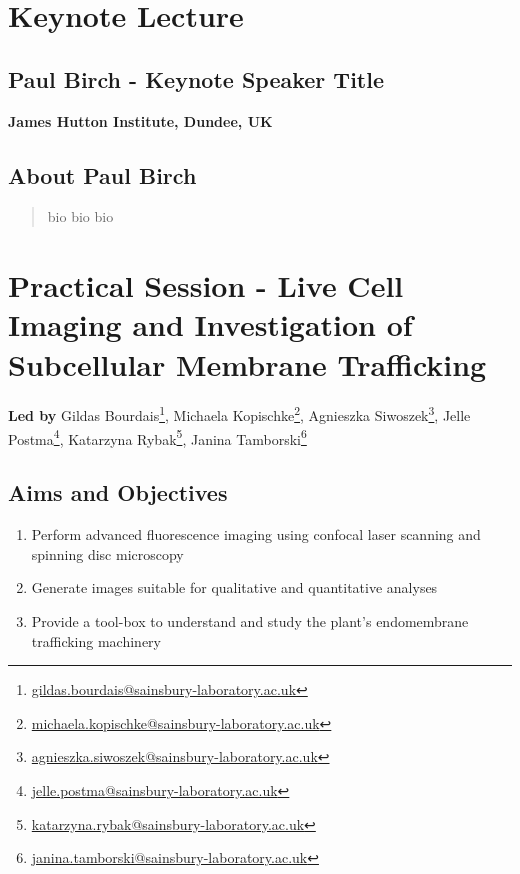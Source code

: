 \documentclass[12pt,]{book}
\providecommand{\tightlist}{%
  \setlength{\itemsep}{0pt}\setlength{\parskip}{0pt}}
\let\rmarkdownfootnote\footnote%
\def\footnote{\protect\rmarkdownfootnote}
\renewcommand{\href}[2]{#2\footnote{\url{#1}}}
\begin{document}
\section*{Keynote Lecture}\label{keynote-lecture-4}

\subsection*{Paul Birch - Keynote Speaker
Title}\label{paul-birch---keynote-speaker-title}

\textbf{James Hutton Institute, Dundee, UK}

\subsection*{About Paul Birch}\label{about-paul-birch}

\begin{quote}
bio bio bio
\end{quote}

\section*{Practical Session - Live Cell Imaging and Investigation of
Subcellular Membrane
Trafficking}\label{practical-session---live-cell-imaging-and-investigation-of-subcellular-membrane-trafficking}

\textbf{Led by} \href{gildas.bourdais@sainsbury-laboratory.ac.uk}{Gildas
Bourdais}, \href{michaela.kopischke@sainsbury-laboratory.ac.uk}{Michaela
Kopischke},
\href{agnieszka.siwoszek@sainsbury-laboratory.ac.uk}{Agnieszka
Siwoszek}, \href{jelle.postma@sainsbury-laboratory.ac.uk}{Jelle Postma},
\href{katarzyna.rybak@sainsbury-laboratory.ac.uk}{Katarzyna Rybak},
\href{janina.tamborski@sainsbury-laboratory.ac.uk}{Janina Tamborski}

\subsection*{Aims and Objectives}\label{aims-and-objectives-4}

\begin{enumerate}
\def\labelenumi{\arabic{enumi}.}
\tightlist
\item
  Perform advanced fluorescence imaging using confocal laser scanning
  and spinning disc microscopy
\item
  Generate images suitable for qualitative and quantitative analyses
\item
  Provide a tool-box to understand and study the plant's endomembrane
  trafficking machinery
\end{enumerate}
\end{document}

